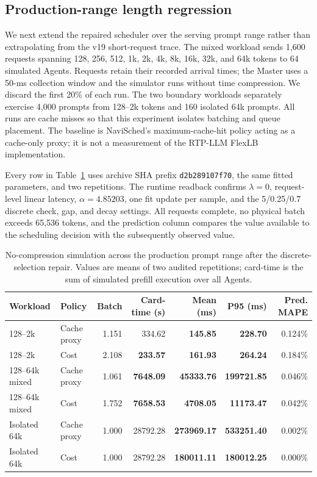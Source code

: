 \documentclass[10pt]{article}
\newcommand{\code}[1]{\texttt{#1}}
\newcommand{\keydata}[1]{\textcolor{green!40!black}{\textbf{#1}}}
\newcommand{\alertdata}[1]{\textcolor{red!70!black}{\textbf{#1}}}
\begin{document}
\FloatBarrier
\subsection{Production-range length regression}

We next extend the repaired scheduler over the serving prompt range rather
than extrapolating from the v19 short-request trace. The mixed workload sends
1,600 requests spanning 128, 256, 512, 1k, 2k, 4k, 8k, 16k, 32k, and 64k
tokens to 64 simulated Agents. Requests retain their recorded arrival times;
the Master uses a 50-ms collection window and the simulator runs without time
compression. We discard the first 20\% of each run. The two boundary
workloads separately exercise 4,000 prompts from 128--2k tokens and 160
isolated 64k prompts. All runs are cache misses so that this experiment
isolates batching and queue placement. The baseline is NaviSched's
maximum-cache-hit policy acting as a cache-only proxy; it is not a measurement
of the RTP-LLM FlexLB implementation.

Every row in Table~\ref{tab:production-range-repair} uses archive SHA prefix
\code{d2b289107f70}, the same fitted parameters, and two repetitions. The
runtime readback confirms $\lambda=0$, request-level linear latency,
$\alpha=4.85203$, one fit update per sample, and the 5/0.25/0.7 discrete
check, gap, and decay settings. All requests complete, no physical batch
exceeds 65,536 tokens, and the prediction column compares the value available
to the scheduling decision with the subsequently observed value.

\begin{table}[h]
\centering
\caption{No-compression simulation across the production prompt range after
the discrete-selection repair. Values are means of two audited repetitions;
card-time is the sum of simulated prefill execution over all Agents.}
\label{tab:production-range-repair}
\scriptsize
\begin{tabular}{llrrrrr}
\toprule
Workload & Policy & Batch & Card-time (s) & Mean (ms) & P95 (ms) & Pred. MAPE \\
\midrule
128--2k & Cache proxy & 1.151 & 334.62 & \keydata{145.85} & \keydata{228.70} & 0.124\% \\
128--2k & Cost & 2.108 & \keydata{233.57} & \alertdata{161.93} & \alertdata{264.24} & 0.184\% \\
128--64k mixed & Cache proxy & 1.061 & \keydata{7648.09} & \alertdata{45333.76} & \alertdata{199721.85} & 0.046\% \\
128--64k mixed & Cost & 1.752 & \alertdata{7658.53} & \keydata{4708.05} & \keydata{11173.47} & 0.042\% \\
Isolated 64k & Cache proxy & 1.000 & 28792.28 & \alertdata{273969.17} & \alertdata{533251.40} & 0.002\% \\
Isolated 64k & Cost & 1.000 & 28792.28 & \keydata{180011.11} & \keydata{180012.25} & 0.000\% \\
\bottomrule
\end{tabular}
\end{table}
\end{document}
